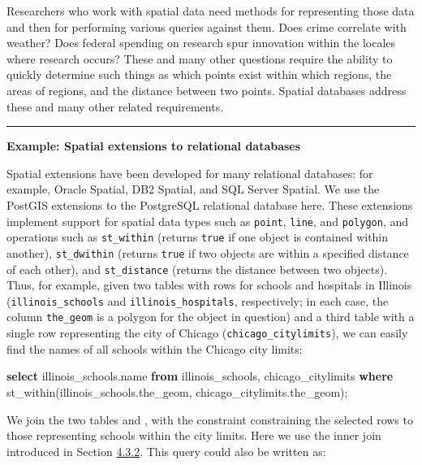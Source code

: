 \documentclass[]{krantz}
\newenvironment{Shaded}{\begin{snugshade}}{\end{snugshade}}
\newcommand{\KeywordTok}[1]{\textcolor[rgb]{0.13,0.29,0.53}{\textbf{#1}}}
\newcommand{\NormalTok}[1]{#1}
\begin{document}
Researchers who work with spatial data need methods for representing
those data and then for performing various queries against them. Does
crime correlate with weather? Does federal spending on research spur
innovation within the locales where research occurs? These and many
other questions require the ability to quickly determine such things as
which points exist within which regions, the areas of regions, and the
distance between two points. Spatial databases address these and many
other related requirements.

\begin{center}\rule{0.5\linewidth}{\linethickness}\end{center}

\textbf{Example: Spatial extensions to relational databases}

Spatial extensions have been developed for many relational databases:
for example, Oracle Spatial, DB2 Spatial, and SQL Server Spatial. We use
the PostGIS extensions to the PostgreSQL relational database here. These
extensions implement support for spatial data types such as
\texttt{point}, \texttt{line}, and \texttt{polygon}, and operations such
as \texttt{st\_within} (returns \texttt{true} if one object is contained
within another), \texttt{st\_dwithin} (returns \texttt{true} if two
objects are within a specified distance of each other), and
\texttt{st\_distance} (returns the distance between two objects). Thus,
for example, given two tables with rows for schools and hospitals in
Illinois (\texttt{illinois\_schools} and \texttt{illinois\_hospitals},
respectively; in each case, the column \texttt{the\_geom} is a polygon
for the object in question) and a third table with a single row
representing the city of Chicago (\texttt{chicago\_citylimits}), we can
easily find the names of all schools within the Chicago city limits:

\begin{Shaded}
\begin{Highlighting}[]
\KeywordTok{select}\NormalTok{ illinois_schools.name}
  \KeywordTok{from}\NormalTok{ illinois_schools, chicago_citylimits}
  \KeywordTok{where}\NormalTok{ st_within(illinois_schools.the_geom,}
\NormalTok{                  chicago_citylimits.the_geom);}
\end{Highlighting}
\end{Shaded}

We join the two tables and , with the constraint constraining the
selected rows to those representing schools within the city limits. Here
we use the inner join introduced in Section
\protect\hyperlink{sec:db:sql}{4.3.2}. This query could also be written
as:
\end{document}

